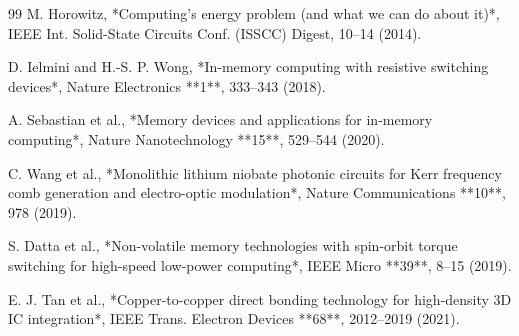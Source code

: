 \documentclass[10pt,twocolumn]{article}
\begin{document}
\begin{thebibliography}{99}
 M. Horowitz, *Computing's energy problem (and what we can do about it)*, IEEE Int. Solid-State Circuits Conf. (ISSCC) Digest, 10–14 (2014).

 D. Ielmini and H.-S. P. Wong, *In-memory computing with resistive switching devices*, Nature Electronics **1**, 333–343 (2018).

 A. Sebastian et al., *Memory devices and applications for in-memory computing*, Nature Nanotechnology **15**, 529–544 (2020).

 C. Wang et al., *Monolithic lithium niobate photonic circuits for Kerr frequency comb generation and electro-optic modulation*, Nature Communications **10**, 978 (2019).

 S. Datta et al., *Non-volatile memory technologies with spin-orbit torque switching for high-speed low-power computing*, IEEE Micro **39**, 8–15 (2019).

 E. J. Tan et al., *Copper-to-copper direct bonding technology for high-density 3D IC integration*, IEEE Trans. Electron Devices **68**, 2012–2019 (2021).
\end{thebibliography}
\end{document}
